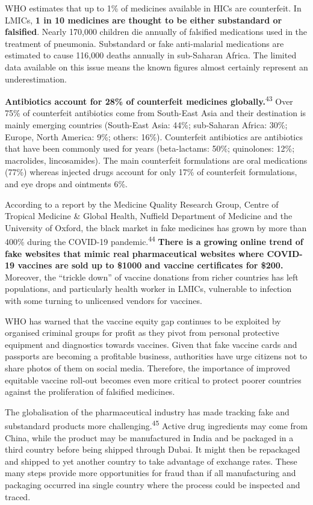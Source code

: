 \documentclass[
  11pt,
  paper=a4,
  ,captions=tableheading
]{scrartcl}
\begin{document}
WHO estimates that up to 1\% of medicines available in HICs are
counterfeit. In LMICs, \textbf{1 in 10 medicines are thought to be
either substandard or falsified}. Nearly 170,000 children die annually
of falsified medications used in the treatment of pneumonia. Substandard
or fake anti-malarial medications are estimated to cause 116,000 deaths
annually in sub-Saharan Africa. The limited data available on this issue
means the known figures almost certainly represent an underestimation.

\textbf{Antibiotics account for 28\% of counterfeit medicines
globally.}\textsuperscript{43} Over 75\% of counterfeit antibiotics come
from South-East Asia and their destination is mainly emerging countries
(South-East Asia: 44\%; sub-Saharan Africa: 30\%; Europe, North America:
9\%; others: 16\%). Counterfeit antibiotics are antibiotics that have
been commonly used for years (beta-lactams: 50\%; quinolones: 12\%;
macrolides, lincosamides). The main counterfeit formulations are oral
medications (77\%) whereas injected drugs account for only 17\% of
counterfeit formulations, and eye drops and ointments 6\%.

According to a report by the Medicine Quality Research Group, Centre of
Tropical Medicine \& Global Health, Nuffield Department of Medicine and
the University of Oxford, the black market in fake medicines has grown
by more than 400\% during the COVID-19 pandemic.\textsuperscript{44}
\textbf{There is a growing online trend of fake websites that mimic real
pharmaceutical websites where COVID-19 vaccines are sold up to \$1000
and vaccine certificates for \$200.} Moreover, the ``trickle down'' of
vaccine donations from richer countries has left populations, and
particularly health worker in LMICs, vulnerable to infection with some
turning to unlicensed vendors for vaccines.

WHO has warned that the vaccine equity gap continues to be exploited by
organised criminal groups for profit as they pivot from personal
protective equipment and diagnostics towards vaccines. Given that fake
vaccine cards and passports are becoming a profitable business,
authorities have urge citizens not to share photos of them on social
media. Therefore, the importance of improved equitable vaccine roll-out
becomes even more critical to protect poorer countries against the
proliferation of falsified medicines.

The globalisation of the pharmaceutical industry has made tracking fake
and substandard products more challenging.\textsuperscript{45} Active
drug ingredients may come from China, while the product may be
manufactured in India and be packaged in a third country before being
shipped through Dubai. It might then be repackaged and shipped to yet
another country to take advantage of exchange rates. These many steps
provide more opportunities for fraud than if all manufacturing and
packaging occurred ina single country where the process could be
inspected and traced.
\end{document}
